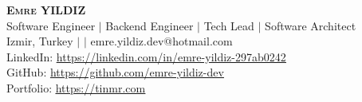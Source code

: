 \begin{center}
    \textbf{\Huge \scshape Emre YILDIZ} \\ \vspace{2pt}
    \large Software Engineer $|$ Backend Engineer $|$ Tech Lead $|$ Software Architect \\ \vspace{2pt}
    Izmir, Turkey $|$ \PhoneNumber $|$ emre.yildiz.dev@hotmail.com \\ \vspace{1pt}
    LinkedIn: \href{https://linkedin.com/in/emre-yildiz-297ab0242}{\underline{https://linkedin.com/in/emre-yildiz-297ab0242}} \\ \vspace{1pt}
    GitHub: \href{https://github.com/emre-yildiz-dev}{\underline{https://github.com/emre-yildiz-dev}} \\ \vspace{1pt}
    Portfolio: \href{https://tinmr.com}{\underline{https://tinmr.com}}
\end{center}